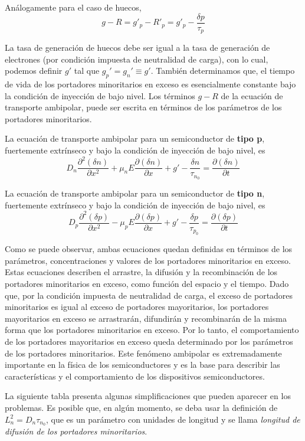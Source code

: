 \documentclass[12pt,a4paper]{article}
\begin{document}
Análogamente para el caso de huecos,
\[ g-R=g'_{p} - R'_{p}=g'_{p}-\frac{\delta p}{\tau _{p}} \]

La tasa de generación de huecos debe ser igual a la tasa de generación de electrones (por condición impuesta de neutralidad de carga), con lo cual, podemos definir $g'$ tal que $g_{p}'=g_{n}'\equiv g'$. También determinamos que, el tiempo de vida de los portadores minoritarios en exceso es esencialmente constante bajo la condición de inyección de bajo nivel. Los términos $g-R$ de la ecuación de transporte ambipolar, puede ser escrita en términos de los parámetros de los portadores minoritarios.

La ecuación de transporte ambipolar para un semiconductor de \textbf{tipo p}, fuertemente extrínseco y bajo la condición de inyección de bajo nivel, es
\[ D_{n} \frac{\partial^{2} (\delta n)}{\partial x^{2}} + \mu _{n}E \frac{\partial (\delta n)}{\partial x} + g' - \frac{\delta n}{\tau _{n_{0}}} = \frac{\partial (\delta n)}{\partial t} \]

La ecuación de transporte ambipolar para un semiconductor de \textbf{tipo n}, fuertemente extrínseco y bajo la condición de inyección de bajo nivel, es
\[ D_{p} \frac{\partial^{2} (\delta p)}{\partial x^{2}} - \mu _{p}E \frac{\partial (\delta p)}{\partial x} + g' - \frac{\delta p}{\tau _{p_{0}}} = \frac{\partial (\delta p)}{\partial t} \]

Como se puede observar, ambas ecuaciones quedan definidas en términos de los parámetros, concentraciones y valores de los portadores minoritarios en exceso. Estas ecuaciones describen el arrastre, la difusión y la recombinación de los portadores minoritarios en exceso, como función del espacio y el tiempo. Dado que, por la condición impuesta de neutralidad de carga, el exceso de portadores minoritarios es igual al exceso de portadores mayoritarios, los portadores mayoritarios en exceso se arrastrarán, difundirán y recombinarán de la misma forma que los portadores minoritarios en exceso. Por lo tanto, el comportamiento de los portadores mayoritarios en exceso queda determinado por los parámetros de los portadores minoritarios. Este fenómeno ambipolar es extremadamente importante en la física de los semiconductores y es la base para describir las características y el comportamiento de los dispositivos semiconductores.

La siguiente tabla presenta algunas simplificaciones que pueden aparecer en los problemas. Es posible que, en algún momento, se deba usar la definición de $L_{n}^{2}=D_{n}\tau _{n_{0}}$, que es un parámetro con unidades de longitud y se llama \emph{longitud de difusión de los portadores minoritarios}.
\end{document}
